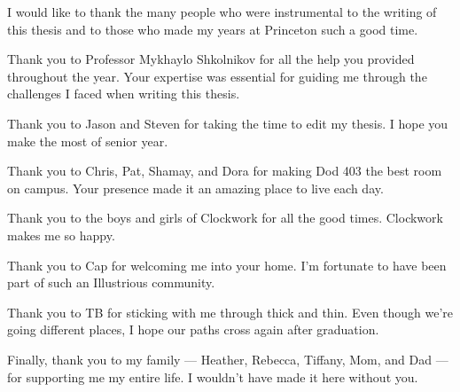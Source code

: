 I would like to thank the many people who were instrumental to the writing of this thesis and to those who made my years at Princeton such a good time.

Thank you to Professor Mykhaylo Shkolnikov for all the help you provided throughout the year. Your expertise was essential for guiding me through the challenges I faced when writing this thesis.

Thank you to Jason and Steven for taking the time to edit my thesis. I hope you make the most of senior year.

Thank you to Chris, Pat, Shamay, and Dora for making Dod 403 the best room on campus. Your presence made it an amazing place to live each day.

Thank you to the boys and girls of Clockwork for all the good times. Clockwork makes me so happy.

Thank you to Cap for welcoming me into your home. I'm fortunate to have been part of such an Illustrious community.

Thank you to TB for sticking with me through thick and thin. Even though we're going different places, I hope our paths cross again after graduation.

Finally, thank you to my family --- Heather, Rebecca, Tiffany, Mom, and Dad --- for supporting me my entire life. I wouldn't have made it here without you.



